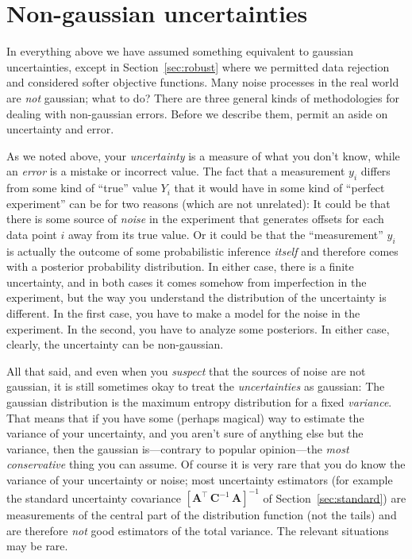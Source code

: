 \documentclass[12pt,twoside]{article}
\newcommand{\sectionname}{Section}
\newcommand{\mmatrix}[1]{\boldsymbol{#1}}
\newcommand{\inverse}[1]{{#1}^{-1}}
\newcommand{\transpose}[1]{{#1}^{\scriptscriptstyle \top}}
\newcommand{\mA}{\mmatrix{A}}
\newcommand{\mAT}{\transpose{\mA}}
\newcommand{\mC}{\mmatrix{C}}
\newcommand{\mCinv}{\inverse{\mC}}
\begin{document}
\section{Non-gaussian uncertainties}

In everything above we have assumed something equivalent to gaussian
uncertainties, except in \sectionname~\ref{sec:robust} where we
permitted data rejection and considered softer objective functions.
Many noise processes in the real world are \emph{not} gaussian; what
to do?  There are three general kinds of methodologies for dealing
with non-gaussian errors.  Before we describe them, permit an aside on
uncertainty and error.

As we noted above, your \emph{uncertainty} is a measure of what you
don't know, while an \emph{error} is a mistake or incorrect value.
The fact that a measurement $y_i$ differs from some kind of ``true''
value $Y_i$ that it would have in some kind of ``perfect experiment''
can be for two reasons (which are not unrelated): It could be that
there is some source of \emph{noise} in the experiment that generates
offsets for each data point $i$ away from its true value.  Or it could
be that the ``measurement'' $y_i$ is actually the outcome of some
probabilistic inference \emph{itself} and therefore comes with a
posterior probability distribution.  In either case, there is a finite
uncertainty, and in both cases it comes somehow from imperfection in
the experiment, but the way you understand the distribution of the
uncertainty is different.  In the first case, you have to make a model
for the noise in the experiment.  In the second, you have to analyze
some posteriors.  In either case, clearly, the uncertainty can be
non-gaussian.

All that said, and even when you \emph{suspect} that the sources of
noise are not gaussian, it is still sometimes okay to treat the
\emph{uncertainties} as gaussian: The gaussian distribution is the
maximum entropy distribution for a fixed \emph{variance}.  That means
that if you have some (perhaps magical) way to estimate the variance
of your uncertainty, and you aren't sure of anything else but the
variance, then the gaussian is---contrary to popular opinion---the
\emph{most conservative} thing you can assume.  Of course it is very
rare that you do know the variance of your uncertainty or noise; most
uncertainty estimators (for example the standard uncertainty
covariance $\inverse{\left[\mAT\,\mCinv\,\mA\right]}$ of
\sectionname~\ref{sec:standard}) are measurements of the central part
of the distribution function (not the tails) and are therefore
\emph{not} good estimators of the total variance.  The relevant
situations may be rare.
\end{document}
